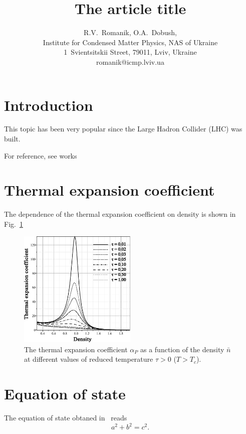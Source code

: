 \documentclass[12pt]{article}
\title{The article title}
\author{R.V.~Romanik, O.A.~Dobush,
	\\ \small Institute for Condensed Matter Physics, NAS of Ukraine 
	\\ \small 1~Svientsitskii Street, 79011, Lviv, Ukraine 
	\\ \small romanik@icmp.lviv.ua}
\begin{document}
	
	\maketitle
	
	
	\section{Introduction}
	This topic has been very popular since the Large Hadron Collider (LHC) was built.
	
	For reference, see works~\cite{Cooper}
	
	\section{Thermal expansion coefficient}
	The dependence of the thermal expansion coefficient on density is shown in Fig.~\ref{fig4}
	
	\begin{figure}[h!]
		\centering \includegraphics[width=0.5\textwidth]{f4.pdf}
		\vskip-3mm\caption{The thermal expansion coefficient $\alpha_P$ as a function of the density $\bar n$ at different values of reduced temperature $\tau > 0$ ($T > T_c$). 
		}\label{fig4}
	\end{figure}
	
	\section{Equation of state}
	The equation of state obtaned in~\cite{KozitskyKozlovskiiDobush2020} reads
	\begin{equation}
		a^2 + b^2 = c^2.
	\end{equation}
	
	
	
\end{document}
